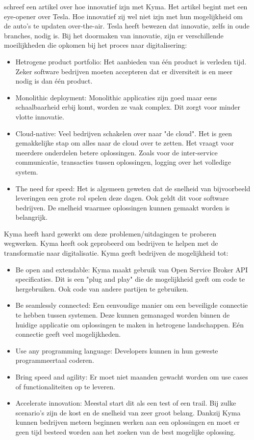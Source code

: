\textcite{Kannappan2018} schreef een artikel over hoe innovatief izjn met Kyma. Het artikel begint met een eye-opener over Tesla. Hoe innovatief zij wel niet izjn met hun mogelijkheid om de auto's te updaten over-the-air. Tesla heeft bewezen dat innovatie, zelfs in oude branches, nodig is. 
Bij het doormaken van innovatie, zijn er verschillende moeilijkheden die opkomen bij het proces naar digitalisering:
\begin{itemize}
	\item Hetrogene product portfolio: Het aanbieden van één product is verleden tijd. Zeker software bedrijven moeten accepteren dat er diversiteit is en meer nodig is dan één product.
	\item Monolithic deployment: Monolithic applicaties zijn goed maar eens schaalbaarheid erbij komt, worden ze vaak complex. Dit zorgt voor minder vlotte innovatie. 
	\item Cloud-native: Veel bedrijven schakelen over naar "de cloud". Het is geen gemakkelijke stap om alles naar de cloud over te zetten. Het vraagt voor meerdere onderdelen betere oplossingen. Zoals voor de inter-service communicatie, transacties tussen oplossingen, logging over het volledige system.
	\item The need for speed: Het is algemeen geweten dat de snelheid van bijvoorbeeld leveringen een grote rol spelen deze dagen. Ook geldt dit voor software bedrijven. De snelheid waarmee oplossingen kunnen gemaakt worden is belangrijk.
\end{itemize}
Kyma heeft hard gewerkt om deze problemen/uitdagingen te proberen wegwerken. Kyma heeft ook geprobeerd om bedrijven te helpen met de transformatie naar digitalisatie. Kyma geeft bedrijven de mogelijkheid tot:
\begin{itemize}
	\item Be open and extendable: Kyma maakt gebruik van Open Service Broker API specificaties. Dit is een "plug and play" die de mogelijkheid geeft om code te hergebruiken. Ook code van andere partijen te gebruiken. 
	\item Be seamlessly connected: Een eenvoudige manier om een beveiligde connectie te hebben tussen systemen. Deze kunnen gemanaged worden binnen de huidige applicatie om oplossingen te maken in hetrogene landschappen. Eén connectie geeft veel mogelijkheden.
	\item Use any programming language: Developers kunnen in hun geweste programmeertaal coderen.
	\item Bring speed and agility: Er moet niet maanden gewacht worden om use cases of functionaliteiten op te leveren. 
	\item Accelerate innovation: Meestal start dit als een test of een trail. Bij zulke scenario's zijn de kost en de snelheid van zeer groot belang. Dankzij Kyma kunnen bedrijven meteen beginnen werken aan een oplossingen en moet er geen tijd besteed worden aan het zoeken van de best mogelijke oplossing. 
\end{itemize}


